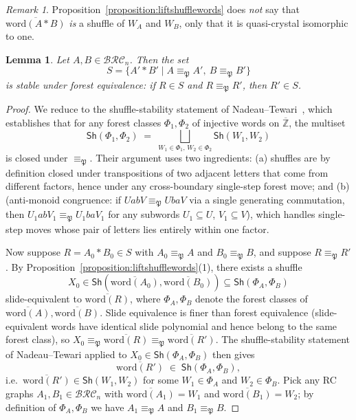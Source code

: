 \documentclass[a4paper,fleqn]{cas-sc}
\newtheorem{lemma}{Lemma}[subsection]
\theoremstyle{definition}
\theoremstyle{remark}
\newtheorem*{remark}{Remark}
\numberwithin{equation}{subsection}
\newcommand{\BRC}{\mathcal{BRC}}
\newcommand{\forest}{\mathfrak{P}}
\begin{document}
\begin{remark}
Proposition~\ref{proposition:liftshufflewords} does \emph{not} say that $\overline{\mathrm{word}(A*B)}$ \emph{is} a shuffle of $W_A$ and $W_B$, only that it is quasi-crystal isomorphic to one.
\end{remark}

\begin{lemma}\label{lemma:foreststable}
Let $A,B\in\BRC_n$. Then the set
$$S=\{A'*B'\mid A\equiv_\forest A',\ B\equiv_\forest B'\}$$
is stable under forest equivalence: if $R\in S$ and $R\equiv_\forest R'$, then $R'\in S$.
\end{lemma}
\begin{proof}
We reduce to the shuffle-stability statement of Nadeau--Tewari~\cite[proof of Theorem~6.3]{nadeau2024forest}, which establishes that for any forest classes $\Phi_1,\Phi_2$ of injective words on $\overline{\mathbb{Z}}$, the multiset
\[
\mathsf{Sh}(\Phi_1,\Phi_2)\;=\;\bigsqcup_{W_1\in\Phi_1,\,W_2\in\Phi_2}\mathsf{Sh}(W_1,W_2)
\]
is closed under $\equiv_\forest$. Their argument uses two ingredients: (a) shuffles are by definition closed under transpositions of two adjacent letters that come from different factors, hence under any cross-boundary single-step forest move; and (b) \cite[Lemma~5.10]{nadeau2024forest} (anti-monoid congruence: if $UabV\equiv_\forest UbaV$ via a single generating commutation, then $U_1abV_1\equiv_\forest U_1baV_1$ for any subwords $U_1\subseteq U$, $V_1\subseteq V$), which handles single-step moves whose pair of letters lies entirely within one factor.

Now suppose $R=A_0*B_0\in S$ with $A_0\equiv_\forest A$ and $B_0\equiv_\forest B$, and suppose $R\equiv_\forest R'$. By Proposition~\ref{proposition:liftshufflewords}(1), there exists a shuffle
\[
X_0\in\mathsf{Sh}(\overline{\mathrm{word}(A_0)},\overline{\mathrm{word}(B_0)})\subseteq\mathsf{Sh}(\Phi_A,\Phi_B)
\]
slide-equivalent to $\overline{\mathrm{word}(R)}$, where $\Phi_A,\Phi_B$ denote the forest classes of $\overline{\mathrm{word}(A)},\overline{\mathrm{word}(B)}$. Slide equivalence is finer than forest equivalence (slide-equivalent words have identical slide polynomial and hence belong to the same forest class), so $X_0\equiv_\forest\overline{\mathrm{word}(R)}\equiv_\forest\overline{\mathrm{word}(R')}$. The shuffle-stability statement of Nadeau--Tewari applied to $X_0\in\mathsf{Sh}(\Phi_A,\Phi_B)$ then gives
\[
\overline{\mathrm{word}(R')}\;\in\;\mathsf{Sh}(\Phi_A,\Phi_B),
\]
i.e.\ $\overline{\mathrm{word}(R')}\in\mathsf{Sh}(W_1,W_2)$ for some $W_1\in\Phi_A$ and $W_2\in\Phi_B$. Pick any RC graphs $A_1,B_1\in\BRC_n$ with $\overline{\mathrm{word}(A_1)}=W_1$ and $\overline{\mathrm{word}(B_1)}=W_2$; by definition of $\Phi_A,\Phi_B$ we have $A_1\equiv_\forest A$ and $B_1\equiv_\forest B$.


\end{proof}
\end{document}

